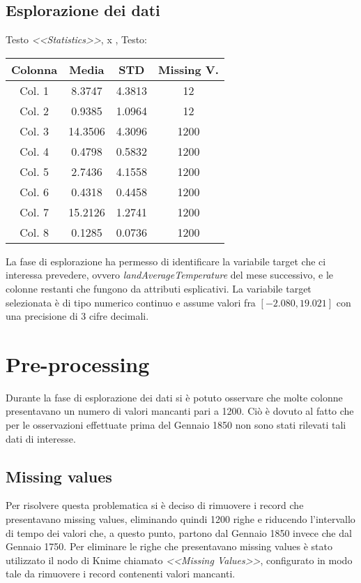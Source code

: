 \documentclass[12pt, a4paper, twocolumn]{article} %
\begin{document}
\subsection{Esplorazione dei dati}
Testo \textit{<<Statistics>>}, x \cite{x}, Testo:
%
\begin{center}
\begin{tabular}{||c c c c||} 
 \hline
 Colonna  & Media & STD & Missing V. \\ [0.5ex] 
 \hline\hline
	Col. 1 &   8.3747 & 4.3813 & 12 \\
\hline\hline
	Col. 2 &   0.9385& 1.0964 & 12 \\
	\hline\hline
	Col. 3 & 14.3506 & 4.3096 & 1200 \\
	\hline\hline
	Col. 4 & 0.4798 & 0.5832 & 1200 \\
	\hline\hline
	Col. 5 &2.7436 & 4.1558 & 1200 \\
	\hline\hline
	Col. 6 & 0.4318 & 0.4458 & 1200 \\
	\hline\hline
	Col. 7 & 15.2126 & 1.2741 & 1200 \\
	\hline\hline
	Col. 8 & 0.1285 & 0.0736 & 1200 \\[0.5ex] \hline 
\end{tabular}
\end{center}

La fase di esplorazione ha permesso di identificare la variabile target che ci interessa prevedere, ovvero \textit{landAverageTemperature} del mese successivo, e le colonne restanti che fungono da attributi esplicativi.
La variabile target selezionata è di tipo numerico continuo e assume valori fra $[-2.080, 19.021]$ con una precisione di 3 cifre decimali.

\section{Pre-processing}
Durante la fase di esplorazione dei dati si è potuto osservare che molte colonne presentavano un numero di valori mancanti pari a 1200. Ciò è dovuto al fatto che per le osservazioni effettuate prima del Gennaio 1850 non sono stati rilevati tali dati di interesse. 

\subsection{Missing values}
Per risolvere questa problematica si è deciso di rimuovere i record che presentavano missing values, eliminando quindi 1200 righe e riducendo l'intervallo di tempo dei valori che, a questo punto, partono dal Gennaio 1850 invece che dal Gennaio 1750. Per eliminare le righe che presentavano missing values è stato utilizzato il nodo di Knime chiamato \textit{<<Missing Values>>}, configurato in modo tale da rimuovere i record contenenti valori mancanti.
\end{document}
